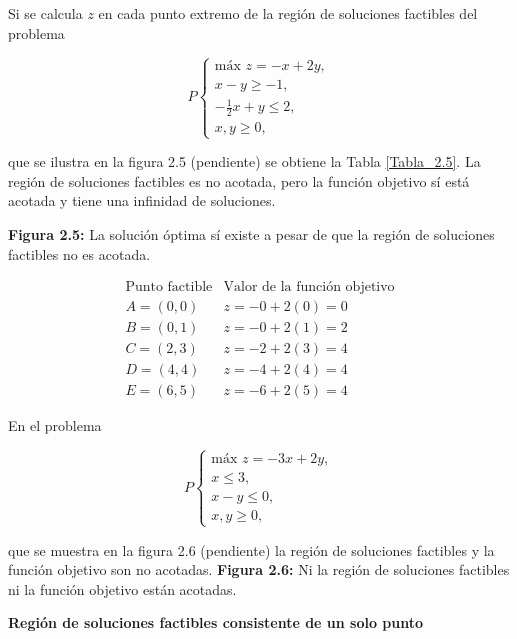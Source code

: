 \begin{Ejem}
Si se calcula $z$ en cada punto extremo de la regi\'on de soluciones factibles del problema

\[
P
\begin{cases}
\text{m\'ax } z = -x + 2y,\\
x - y \ge -1,\\
-\frac{1}{2}x + y \le 2,\\
x,y \ge 0,
\end{cases}
\]

que se ilustra en la figura 2.5 (pendiente) se obtiene la Tabla \ref{Tabla_2.5}. La regi\'on de soluciones factibles es no acotada, pero la funci\'on objetivo s\'i est\'a acotada y tiene una infinidad de soluciones.

\textbf{Figura 2.5:} La soluci\'on \'optima s\'i existe a pesar de que la regi\'on de soluciones factibles no es acotada.

\begin{table}[h]
\centering
\[
\begin{array}{c|c}
\text{Punto factible} & \text{Valor de la funci\'on objetivo} \\
\hline
A=(0,0) & z=-0+2(0)=0 \\
B=(0,1) & z=-0+2(1)=2 \\
C=(2,3) & z=-2+2(3)=4 \\
D=(4,4) & z=-4+2(4)=4 \\
E=(6,5) & z=-6+2(5)=4
\end{array}
\]
\caption{$z$ en diferentes puntos factibles de la regi\'on de soluciones factibles.}
\label{Tabla_2.5}
\end{table}
\end{Ejem}

\begin{Ejem} En el problema

\[
P
\begin{cases}
\text{m\'ax } z = -3x + 2y,\\
x \le 3,\\
x - y \le 0,\\
x,y \ge 0,
\end{cases}
\]

que se muestra en la figura 2.6 (pendiente)  la regi\'on de soluciones factibles y la funci\'on objetivo son no acotadas. \textbf{Figura 2.6:} Ni la regi\'on de soluciones factibles ni la funci\'on objetivo est\'an acotadas.
\end{Ejem}

\textbf{Regi\'on de soluciones factibles consistente de un solo punto}


